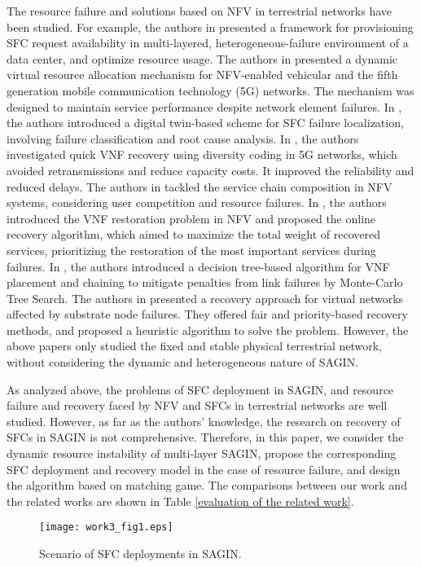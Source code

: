 The resource failure and solutions based on NFV in terrestrial networks have been studied. For example, the authors in \cite{8463632} presented a framework for provisioning SFC request availability in multi-layered, heterogeneous-failure environment of a data center, and optimize resource usage. The authors in \cite{9585385} presented a dynamic virtual resource allocation mechanism for NFV-enabled vehicular and the fifth generation mobile communication technology (5G) networks. The mechanism was designed to maintain service performance despite network element failures. In \cite{10179962}, the authors introduced a digital twin-based scheme for SFC failure localization, involving failure classification and root cause analysis. In \cite{8923413}, the authors investigated quick VNF recovery using diversity coding in 5G networks, which avoided retransmissions and reduce capacity costs. It improved the reliability and reduced delays. The authors in \cite{9296232} tackled the service chain composition in NFV systems, considering user competition and resource failures. In \cite{10533654}, the authors introduced the VNF restoration problem in NFV and proposed the online recovery algorithm, which aimed to maximize the total weight of recovered services, prioritizing the restoration of the most important services during failures. In \cite{7987282}, the authors introduced a decision tree-based algorithm for VNF placement and chaining to mitigate penalties from link failures by Monte-Carlo Tree Search. The authors in \cite{7898396} presented a recovery approach for virtual networks affected by substrate node failures. They offered fair and priority-based recovery methods, and proposed a heuristic algorithm to solve the problem. However, the above papers only studied the fixed and stable physical terrestrial network, without considering the dynamic and heterogeneous nature of SAGIN.

As analyzed above, the problems of SFC deployment in SAGIN, and resource failure and recovery faced by NFV and SFCs in terrestrial networks are well studied. However, as far as the authors' knowledge, the research on recovery of SFCs in SAGIN is not comprehensive. Therefore, in this paper, we consider the dynamic resource instability of multi-layer SAGIN, propose the corresponding SFC deployment and recovery model in the case of resource failure, and design the algorithm based on matching game. The comparisons between our work and the related works are shown in Table \ref{evaluation of the related work}.

\begin{figure}[!t]
    \centerline{\texttt{[image: work3\_fig1.eps]}}
   \caption{Scenario of SFC deployments in SAGIN.}\label{fig1}
\end{figure}

%